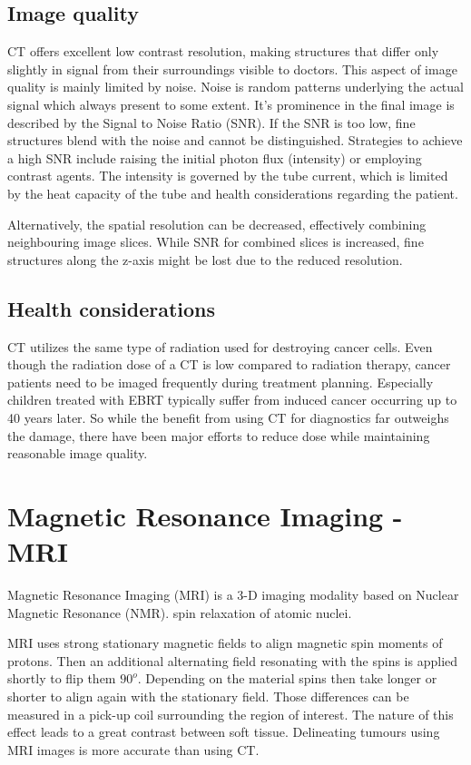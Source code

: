 \subsection{Image quality} %
CT offers excellent low contrast resolution, making structures that differ only slightly in signal from their surroundings visible to doctors.
This aspect of image quality is mainly limited by noise.
Noise is random patterns underlying the actual signal which always present to some extent.
It's prominence in the final image is described by the Signal to Noise Ratio (SNR).
If the SNR is too low, fine structures blend with the noise and cannot be distinguished. 
Strategies to achieve a high SNR include raising the initial photon flux (intensity) or employing contrast agents.
The intensity is governed by the tube current, which is limited by the heat capacity of the tube and health considerations regarding the patient.

Alternatively, the spatial resolution can be decreased, effectively combining neighbouring image slices.
While SNR for combined slices is increased, fine structures along the z-axis might be lost due to the reduced resolution.

\subsection{Health considerations}
CT utilizes the same type of radiation used for destroying cancer cells.
Even though the radiation dose of a CT is low compared to radiation therapy, cancer patients need to be imaged frequently during treatment planning.
Especially children treated with EBRT typically suffer from induced cancer occurring up to 40 years later.
So while the benefit from using CT for diagnostics far outweighs the damage, there have been major efforts to reduce dose while maintaining reasonable image quality.
\cite{Murphy2007, Brenner2001, Sodickson2009, Smith2007, McCollough2009, Goldman2013}


\section{Magnetic Resonance Imaging - MRI}
Magnetic Resonance Imaging (MRI) is a 3-D imaging modality based on  Nuclear Magnetic Resonance (NMR).
spin relaxation of atomic nuclei.


MRI uses strong stationary magnetic fields to align magnetic spin moments of protons.
Then an additional alternating field resonating with the spins is applied shortly to flip them $90^o$.
Depending on the material spins then take longer or shorter to align again with the stationary field.
Those differences can be measured in a pick-up coil surrounding the region of interest.
The nature of this effect leads to a great contrast between soft tissue. \cite{Currie2013}
Delineating tumours using MRI images is more accurate than using CT. \cite{Rasch1999, Debois1999a, Roach1996}

